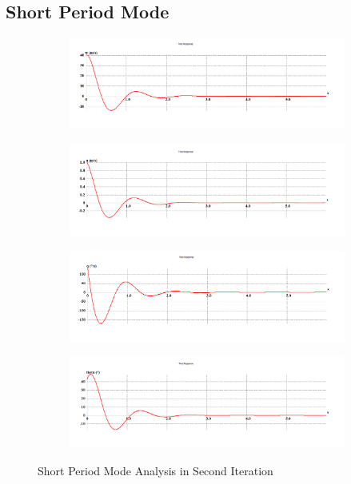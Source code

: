 \subsection{Short Period Mode}
\begin{figure}[H]
\begin{subfigure}{0.48\textwidth}
\includegraphics[width = \linewidth]{w__2_.png}
\end{subfigure}
\begin{subfigure}{0.48\textwidth}
\includegraphics[width = \linewidth]{u__2_.png}
\end{subfigure}
\medskip
\begin{subfigure}{0.48\textwidth}
\includegraphics[width = \linewidth]{q__2_.png}
\end{subfigure}
\begin{subfigure}{0.48\textwidth}
\includegraphics[width = \linewidth]{theta__2_.png}
\end{subfigure}
\caption{Short Period Mode Analysis in Second Iteration}
\end{figure}

